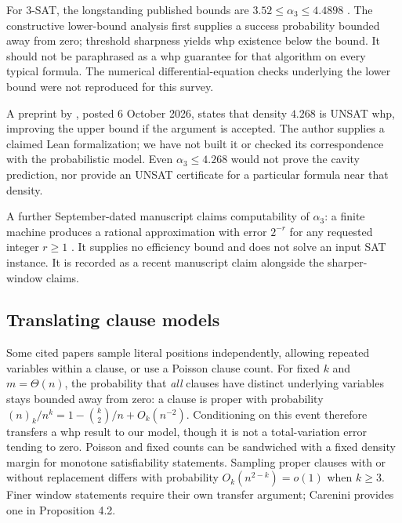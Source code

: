 For $3$-SAT, the longstanding published bounds are
$3.52\le\alpha_3\le4.4898$
\citep[Section 5]{kkl2006}\citep[Theorem 1]{diaz2008}.
The constructive lower-bound analysis first supplies a success probability
bounded away from zero; threshold sharpness yields whp existence below the
bound. It should not be paraphrased as a whp guarantee for that algorithm on
every typical formula. The numerical differential-equation checks underlying
the lower bound were not reproduced for this survey.

A preprint by \citet[Theorem 1.1]{vorobyev2026}, posted 6 October 2026,
states that density $4.268$ is UNSAT whp, improving the upper bound if the
argument is accepted. The author supplies a claimed Lean formalization; we
have not built it or checked its correspondence with the probabilistic model.
Even $\alpha_3\le4.268$ would not prove the cavity prediction, nor provide
an UNSAT certificate for a particular formula near that density.

A further September-dated manuscript claims computability of $\alpha_3$:
a finite machine produces a rational approximation with error $2^{-r}$ for
any requested integer $r\ge1$ \citep[Theorem 1.1]{oaComputing}. It supplies
no efficiency bound and does not solve an input SAT instance. It is recorded
as a recent manuscript claim alongside the sharper-window claims.

\subsection{Translating clause models}
Some cited papers sample literal positions independently, allowing repeated
variables within a clause, or use a Poisson clause count. For fixed $k$ and
$m=\Theta(n)$, the probability that \emph{all} clauses have distinct underlying
variables stays bounded away from zero: a clause is proper with probability
$(n)_k/n^k=1-\binom{k}{2}/n+O_k(n^{-2})$. Conditioning on this event
therefore transfers a whp result to our model, though it is not a total-variation
error tending to zero. Poisson and fixed counts can be sandwiched with a fixed
density margin for monotone satisfiability statements. Sampling proper clauses
with or without replacement differs with probability $O_k(n^{2-k})=o(1)$
when $k\ge3$. Finer window statements require their own transfer argument;
Carenini provides one in Proposition 4.2.
